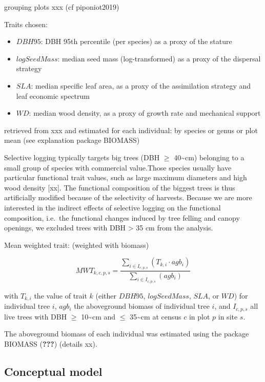 \documentclass[]{elsarticle} %
\begin{document}
grouping plots xxx (cf piponiot2019)

Traits chosen:

\begin{itemize}
\item
  \(DBH95\): DBH 95th percentile (per species) as a proxy of the stature
\item
  \(logSeedMass\): median seed mass (log-transformed) as a proxy of the
  dispersal strategy
\item
  \(SLA\): median specific leaf area, as a proxy of the assimilation
  strategy and leaf economic spectrum
\item
  \(WD\): median wood density, as a proxy of growth rate and mechanical
  support
\end{itemize}

retrieved from xxx and estimated for each individual: by species or
genus or plot mean (see explanation package BIOMASS)

Selective logging typically targets big trees (DBH \(\geq\)
40\textasciitilde{}cm) belonging to a small group of species with
commercial value.Those species usually have particular functional trait
values, such as large maximum diameters and high wood density {[}xx{]}.
The functional composition of the biggest trees is thus artificially
modified because of the selectivity of harvests. Because we are more
interested in the indirect effects of selective logging on the
functional composition, i.e.~the functional changes induced by tree
felling and canopy openings, we excluded trees with DBH \textgreater{}
35 cm from the analysis.

Mean weighted trait: (weighted with biomass)

\begin{equation}  
MWT_{k,c,p,s} = \frac{\sum_{i \in I_{c,p,s}}(T_{k,i}\cdot agb_i)}{\sum_{i \in I_{c,p,s}}(agb_i)}
\end{equation}

with \(T_{k,i}\) the value of trait \(k\) (either \(DBH95\),
\(logSeedMass\), \(SLA\), or \(WD\)) for individual tree \(i\),
\(agb_i\) the aboveground biomass of individual tree \(i\), and
\(I_{c,p,s}\) all live trees with DBH \(\geq\) 10\textasciitilde{}cm and
\(\leq\) 35\textasciitilde{}cm at census \(c\) in plot \(p\) in site
\(s\).

The aboveground biomass of each individual was estimated using the
package BIOMASS ({\textbf{???}}) (details xx).

\subsection{Conceptual model}\label{conceptual-model}
\end{document}
